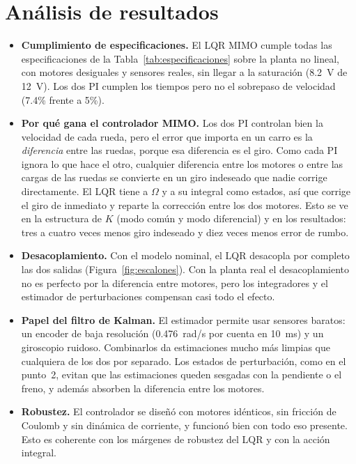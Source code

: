 \documentclass[11pt,letterpaper]{article}
\begin{document}
\section{Análisis de resultados}
\begin{itemize}
  \item \textbf{Cumplimiento de especificaciones.} El LQR MIMO cumple todas las especificaciones de la Tabla~\ref{tab:especificaciones} sobre la planta no lineal, con motores desiguales y sensores reales, sin llegar a la saturación (8.2~V de 12~V). Los dos PI cumplen los tiempos pero no el sobrepaso de velocidad (7.4\% frente a 5\%).

  \item \textbf{Por qué gana el controlador MIMO.} Los dos PI controlan bien la velocidad de cada rueda, pero el error que importa en un carro es la \emph{diferencia} entre las ruedas, porque esa diferencia es el giro. Como cada PI ignora lo que hace el otro, cualquier diferencia entre los motores o entre las cargas de las ruedas se convierte en un giro indeseado que nadie corrige directamente. El LQR tiene a $\Omega$ y a su integral como estados, así que corrige el giro de inmediato y reparte la corrección entre los dos motores. Esto se ve en la estructura de $K$ (modo común y modo diferencial) y en los resultados: tres a cuatro veces menos giro indeseado y diez veces menos error de rumbo.

  \item \textbf{Desacoplamiento.} Con el modelo nominal, el LQR desacopla por completo las dos salidas (Figura~\ref{fig:escalones}). Con la planta real el desacoplamiento no es perfecto por la diferencia entre motores, pero los integradores y el estimador de perturbaciones compensan casi todo el efecto.

  \item \textbf{Papel del filtro de Kalman.} El estimador permite usar sensores baratos: un encoder de baja resolución (0.476~rad/s por cuenta en 10~ms) y un giroscopio ruidoso. Combinarlos da estimaciones mucho más limpias que cualquiera de los dos por separado. Los estados de perturbación, como en el punto~2, evitan que las estimaciones queden sesgadas con la pendiente o el freno, y además absorben la diferencia entre los motores.

  \item \textbf{Robustez.} El controlador se diseñó con motores idénticos, sin fricción de Coulomb y sin dinámica de corriente, y funcionó bien con todo eso presente. Esto es coherente con los márgenes de robustez del LQR y con la acción integral.


\end{itemize}
\end{document}
